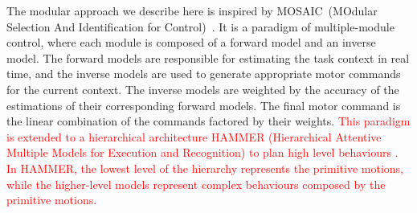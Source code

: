 

The modular approach we describe here is inspired by
MOSAIC~(MOdular Selection And
Identification for Control)~\citep{haruno2001mosaic}. It is a paradigm of multiple-module control,
where each module is composed of a forward model and an inverse
model. The forward models are responsible for estimating the task
context in real time, and the inverse models are used to generate
appropriate motor commands for the current context. The inverse models
are weighted by the accuracy of the estimations of their corresponding
forward models. The final motor command is the linear combination of
the commands factored by their weights. \textcolor{red}{This paradigm is extended to a hierarchical architecture HAMMER (Hierarchical Attentive Multiple Models for Execution and Recognition) to plan high level behaviours \citet{johnson2005hierarchies,demiris2006hierarchical}. In HAMMER, the lowest level of the hierarchy represents the primitive motions, while the higher-level models represent complex behaviours composed by the primitive motions. }


